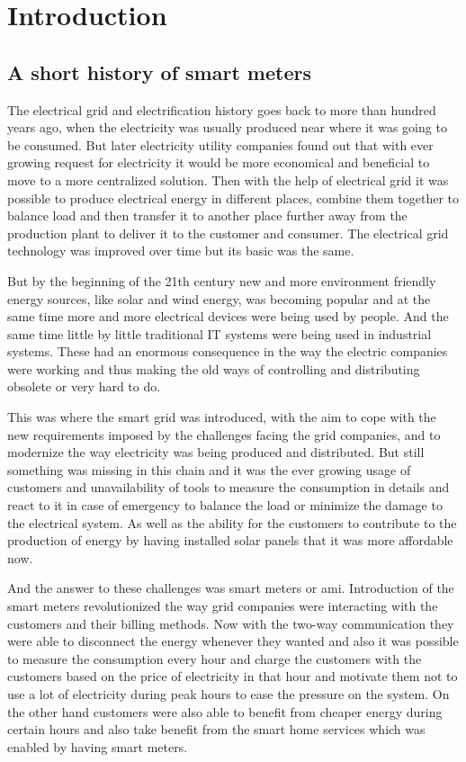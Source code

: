 \chapter{Introduction}
\section{A short history of smart meters}

The electrical grid and electrification history goes back to more than hundred years ago, when the electricity was usually produced near where it was going to be consumed. But later electricity utility companies found out that with ever growing request for electricity it would be more economical and beneficial to move to a more centralized solution. Then with the help of electrical grid it was possible to produce electrical energy in different places, combine them together to balance load and then transfer it to another place further away from the production plant to deliver it to the customer and consumer. The electrical grid technology was improved over time but its basic was the same.\par
But by the beginning of the 21th century new and more environment friendly energy sources, like solar and wind energy, was becoming popular and at the same time more and more electrical devices were being used by people. And the same time little by little traditional IT systems were being used in industrial systems. These had an enormous consequence in the way the electric companies were working and thus making the old ways of controlling and distributing obsolete or very hard to do.\par 
This was where the smart grid was introduced, with the aim to cope with the new requirements imposed by the challenges facing the grid companies, and to modernize the way electricity was being produced and distributed. But still something was missing in this chain and it was the ever growing usage of customers and unavailability of tools to measure the consumption in details and react to it in case of emergency to balance the load or minimize the damage to the electrical system. As well as the ability for the customers to contribute to the production of energy by having installed solar panels that it was more affordable now.\par 
And the answer to these challenges was smart meters or \ac{ami}. Introduction of the smart meters revolutionized the way grid companies were interacting with the customers and their billing methods. Now with the two-way communication they were able to disconnect the energy whenever they wanted and also it was possible to measure the consumption every hour and charge the customers with the customers based on the price of electricity in that hour and motivate them not to use a lot of electricity during peak hours to ease the pressure on the system. On the other hand customers were also able to benefit from cheaper energy during certain hours and also take benefit from the smart home services which was enabled by having smart meters.

